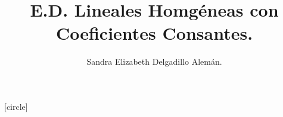 
\title{E.D. Lineales Homgéneas con Coeficientes Consantes.}
\author{Sandra Elizabeth Delgadillo Alemán.}

[circle] %
\usepackage{cancel}

\newcommand\Myref[1]{
  \begingroup
  \usebeamerfont*{item projected}%
  \usebeamercolor[bg]{item projected}%
  \begin{pgfpicture}{-1ex}{0ex}{1ex}{2ex}
    \pgfpathcircle{\pgfpoint{0pt}{.75ex}}{1.2ex}
    \pgfusepath{fill}
    \pgftext[base]{\color{fg}\ref{#1}}
  \end{pgfpicture}%
  \endgroup
}
\newcommand{\dis}{\displaystyle} 
